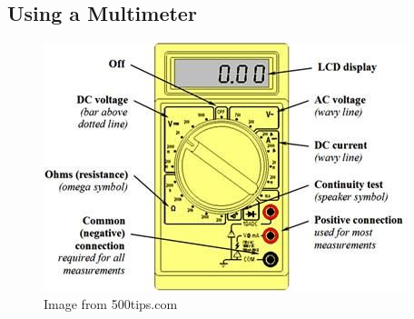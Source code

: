 \documentclass{article}
\theoremstyle{definition}
\theoremstyle{definition}
\theoremstyle{remark}
\begin{document}

  {\color{blue}\subsection{Using a Multimeter}} %
  \label{sub:using_a_multimeter}

    \begin{figure}[!ht]
      \centering
      \includegraphics[width=0.65\paperwidth]{Images/image_a_1_(multimeter).png}
      \caption*{Image from 500tips.com}
    \end{figure}
  

\end{document}
